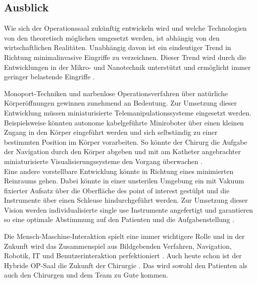 \subsection{Ausblick}

Wie sich der Operationssaal zukünftig entwickeln wird und welche Technologien von den theoretisch möglichen umgesetzt werden, ist abhängig von den wirtschaftlichen Realitäten. Unabhängig davon ist ein eindeutiger Trend in Richtung minimalinvasive Eingriffe zu verzeichnen. Dieser Trend wird durch die Entwicklungen in der Mikro- und Nanotechnik unterstützt und ermöglicht immer geringer belastende Eingriffe \cite{DerDigitaleOperationssaal}. 

Monoport-Techniken und narbenlose Operationsverfahren über natürliche Körperöffnungen gewinnen zunehmend an Bedeutung. Zur Umsetzung dieser Entwicklung müssen miniaturisierte Telemanipulationssysteme eingesetzt werden. Beispielsweise könnten autonome kabelgeführte Miniroboter über einen kleinen Zugang in den Körper eingeführt werden und sich selbständig zu einer bestimmten Position im Körper vorarbeiten. So könnte der Chirurg die Aufgabe der Navigation durch den Körper abgeben und mit am Katheter angebrachter miniaturisierte Visualisierungssysteme den Vorgang überwachen \cite{DerDigitaleOperationssaal}.\\
Eine andere vorstellbare Entwicklung könnte in Richtung eines minimierten Reinraums gehen. Dabei könnte in einer unsterilen Umgebung ein mit Vakuum fixierter Aufsatz über die Oberfläche des \glqq point of interest\grqq{} gestülpt und die Instrumente über einen Schleuse hindurchgeführt werden. Zur Umsetzung dieser Vision werden individualisierte \glqq single use\grqq{} Instrumente angefertigt und garantieren so eine optimale Abstimmung auf den Patienten und die Aufgabenstellung \cite{DerDigitaleOperationssaal}.

Die Mensch-Maschine-Interaktion spielt eine immer wichtigere Rolle und in der Zukunft wird das Zusammenspiel aus Bildgebenden Verfahren, Navigation, Robotik, IT und Benutzerinteraktion perfektioniert \cite{CurrentAndFuture}.
Auch heute schon ist der Hybride OP-Saal die Zukunft der Chirurgie \cite{Maquet}. Das wird sowohl den Patienten als auch den Chirurgen und dem Team zu Gute kommen.


	
	



